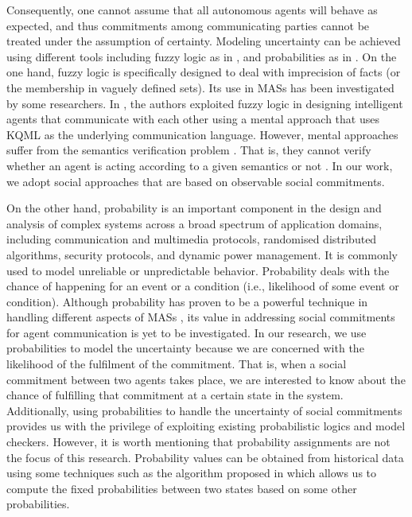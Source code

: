 Consequently, one cannot assume that all autonomous agents will behave as expected, and thus commitments among communicating parties cannot be treated under the assumption of certainty. Modeling uncertainty can be achieved using different tools including fuzzy logic as in \cite{Correa2013,Karray2004}, and probabilities as in \cite{Feng2011,Karthikeyan2013,Perko2011}. On the one hand, fuzzy logic is specifically designed to deal with imprecision of facts (or the membership in vaguely defined sets). Its use in MASs has been investigated by some researchers. In \cite{Garza2011a}, the authors exploited fuzzy logic in designing intelligent agents that communicate with each other using a mental approach that uses KQML \cite{Finin1994} as the underlying communication language.
However, mental approaches suffer from the semantics verification problem \cite{Wooldridge2000}. That is, they cannot verify whether an agent is acting according to a given semantics or not \cite{Wooldridge2009}. In our work, we adopt social approaches that are based on observable social commitments.

On the other hand, probability is an important component in the design and analysis of complex systems across a broad spectrum of application domains, including communication and multimedia protocols, randomised distributed algorithms, security protocols, and dynamic power management. It is commonly  used to model unreliable or unpredictable behavior. Probability deals with the chance of happening for an event or a condition (i.e., likelihood of some event or condition). Although probability has proven to be a powerful technique in handling different aspects of MASs \cite{Kulkarni2010,Wan2013}, its value in addressing social commitments for agent communication is yet to be investigated. In our research, we use probabilities to model the uncertainty because we are concerned with the likelihood of the fulfilment of the commitment. That is, when a social commitment between two agents takes place, we are interested to know about the chance of fulfilling that commitment at a certain state in the system. Additionally, using probabilities to handle the uncertainty of social commitments provides us with the privilege of exploiting existing probabilistic logics and model checkers. However, it is worth mentioning that probability assignments are not the focus of this research. Probability values can be obtained from historical data using some techniques such as the algorithm proposed in \cite{Ormandjieva2008} which allows us to compute the fixed probabilities between two states based on some other probabilities.


